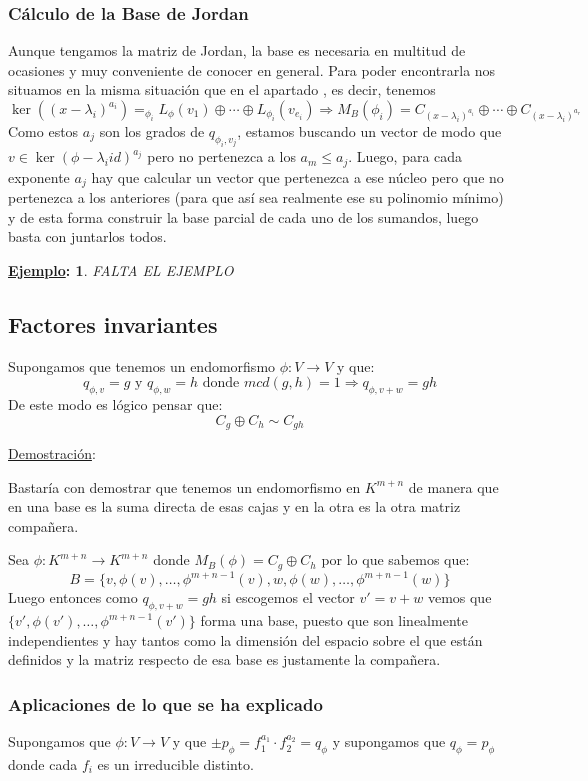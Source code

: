 \documentclass[10pt,a4paper,openright]{book}
\theoremstyle{break}
\newtheorem*{ej}{\underline{Ejemplo}:}
\begin{document}
\subsubsection{Cálculo de la Base de Jordan}
Aunque tengamos la matriz de Jordan, la base es necesaria en multitud de ocasiones y muy conveniente de conocer en general. Para poder encontrarla nos situamos en la misma situación que en el apartado , es decir, tenemos
$$\ker\left((x-\lambda_i)^{a_i}\right) =_{\phi_i} L_\phi(v_1)\oplus \cdots \oplus L_{\phi_i}(v_{e_i}) \Rightarrow M_B(\phi_i) = C_{(x-\lambda_i)^{a_i}} \oplus \cdots \oplus C_{(x-\lambda_i)^{a_r}}$$
Como estos $a_j$ son los grados de $q_{\phi_i, v_j}$, estamos buscando un vector de modo que $v\in \ker\left(\phi - \lambda_i id\right)^{a_j}$ pero no pertenezca a los $a_m \leq a_j$. Luego, para cada exponente $a_j$ hay que calcular un vector que pertenezca a ese núcleo pero que no pertenezca a los anteriores (para que así sea realmente ese su polinomio mínimo) y de esta forma construir la base parcial de cada uno de los sumandos, luego basta con juntarlos todos.

\begin{ej}
FALTA EL EJEMPLO
\end{ej}

\subsection{Factores invariantes}
Supongamos que tenemos un endomorfismo $\phi:V\rightarrow V$ y que:
$$q_{\phi,v} = g\mbox{ y }q_{\phi, w} = h\mbox{ donde }mcd(g,h)=1\Rightarrow q_{\phi, v+w}=gh$$
De este modo es lógico pensar que:
$$C_{g}\oplus C_{h} \sim C_{gh}$$

\underline{Demostración}:

Bastaría con demostrar que tenemos un endomorfismo en $K^{m+n}$ de manera que en una base es la suma directa de esas cajas y en la otra es la otra matriz compañera.

Sea $\phi: K^{m+n}\rightarrow K^{m+n}$ donde $M_B(\phi) = C_{g}\oplus C_{h}$ por lo que sabemos que:
$$B=\{v, \phi(v), \ldots, \phi^{m+n-1}(v), w, \phi(w), \ldots, \phi^{m+n-1}(w)\}$$
Luego entonces como $q_{\phi, v+w}=gh$ si escogemos el vector $v'=v+w$ vemos que $\{v', \phi(v'), \ldots, \phi^{m+n-1}(v')\}$ forma una base, puesto que son linealmente independientes y hay tantos como la dimensión del espacio sobre el que están definidos y la matriz respecto de esa base es justamente la compañera.

\subsubsection{Aplicaciones de lo que se ha explicado}
Supongamos que $\phi: V\rightarrow V$ y que $\pm p_\phi = f_1^{a_1}\cdot f_2^{a_2} = q_\phi$ y supongamos que $q_\phi=p_\phi$ donde cada $f_i$ es un irreducible distinto.
\end{document}

